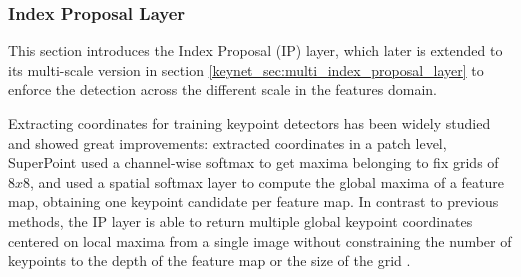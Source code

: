 
\subsubsection{Index Proposal Layer}
\label{keynet_sec:single_index_proposal_layer}

This section introduces the Index Proposal (IP) layer, which later is extended to its multi-scale version in section \ref{keynet_sec:multi_index_proposal_layer} to enforce the detection across the different scale in the features domain. 

Extracting coordinates for training keypoint detectors has been widely studied and showed great improvements: \cite{LIFT, Karel_Vedaldi_ECCV_16, Zhang_Felix_CVPR_17} extracted coordinates in a patch level, SuperPoint \cite{detone2017superpoint} used a channel-wise softmax to get maxima belonging to fix grids of $8x8$, and \cite{keypointnet_nips_18} used a spatial softmax layer to compute the global maxima of a feature map, obtaining one keypoint candidate per feature map. In contrast to previous methods, the IP layer is able to return multiple global keypoint coordinates centered on local maxima from a single image without constraining the number of keypoints to the depth of the feature map \cite{keypointnet_nips_18} or the size of the grid \cite{detone2017superpoint}.

